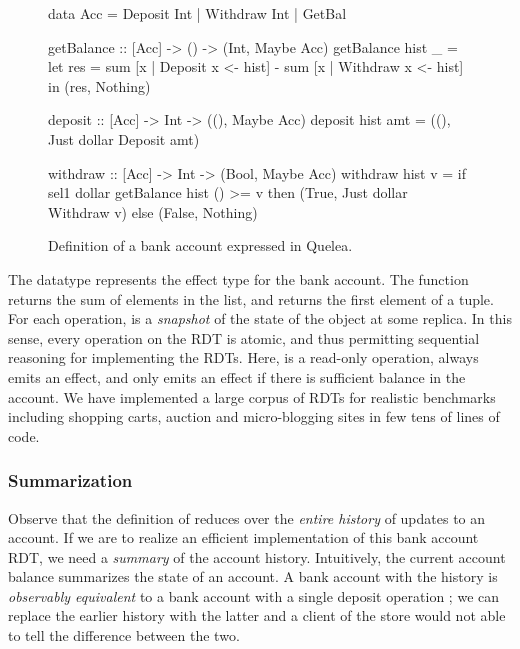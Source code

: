 \begin{figure}
\vspace{-2.3mm}
\begin{codehaskell}
data Acc = Deposit Int | Withdraw Int | GetBal

getBalance :: [Acc] -> () -> (Int, Maybe Acc)
getBalance hist _ =
  let res = sum [x | Deposit x <- hist]
						- sum [x | Withdraw x <- hist]
	in (res, Nothing)

deposit :: [Acc] -> Int -> ((), Maybe Acc)
deposit hist amt = ((), Just dollar Deposit amt)

withdraw :: [Acc] -> Int -> (Bool, Maybe Acc)
withdraw hist v =
	if sel1 dollar getBalance hist () >= v
  then (True, Just dollar Withdraw v)
	else (False, Nothing)
\end{codehaskell}
\caption{Definition of a bank account expressed in Quelea.}
\label{fig:ex}
\end{figure}

The datatype  represents the effect type for the bank account. The
function  returns the sum of elements in the list, and 
returns the first element of a tuple. For each operation,  is a
\emph{snapshot} of the state of the object at some replica. In this sense,
every operation on the RDT is atomic, and thus permitting sequential reasoning
for implementing the RDTs. Here,  is a read-only operation,
 always emits an effect, and  only emits an effect if
there is sufficient balance in the account. We have implemented a large corpus
of RDTs for realistic benchmarks including shopping carts, auction and
micro-blogging sites in few tens of lines of code.

\subsubsection{Summarization}
\label{sec:summarize}

Observe that the definition of  reduces over the \emph{entire
history} of updates to an account. If we are to realize an efficient
implementation of this bank account RDT, we need a \emph{summary} of the
account history. Intuitively, the current account balance summarizes the state
of an account. A bank account with the history  is
\emph{observably equivalent} to a bank account with a single deposit operation
\cf{[Deposit 5]}; we can replace the earlier history with the latter and a
client of the store would not able to tell the difference between the two.

